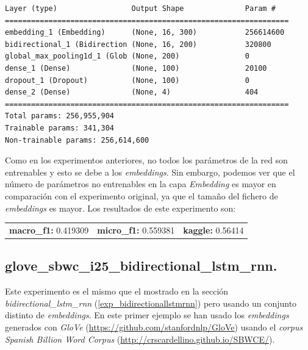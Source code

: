 \documentclass[11pt]{article}
\begin{document}
\begin{verbatim}
Layer (type)                 Output Shape              Param #   
=================================================================
embedding_1 (Embedding)      (None, 16, 300)           256614600 
bidirectional_1 (Bidirection (None, 16, 200)           320800    
global_max_pooling1d_1 (Glob (None, 200)               0         
dense_1 (Dense)              (None, 100)               20100     
dropout_1 (Dropout)          (None, 100)               0         
dense_2 (Dense)              (None, 4)                 404       
=================================================================
Total params: 256,955,904
Trainable params: 341,304
Non-trainable params: 256,614,600
\end{verbatim}

Como en los experimentos anteriores, no todos los parámetros de la red son entrenables y esto se debe a los \textit{embeddings}. Sin embargo, podemos ver que el número de parámetros no entrenables en la capa \textit{Embedding} es mayor en comparación con el experimento original, ya que el tamaño del fichero de \textit{embeddings} es mayor. Los resultados de este experimento son: 

\begin{table}[H]
\begin{tabular}{c|c|c}
\textbf{macro\_f1:} 0.419309 & \textbf{micro\_f1:} 0.559381 & \textbf{kaggle:} 0.56414
\end{tabular}
\end{table}

\subsection{glove\_sbwc\_i25\_bidirectional\_lstm\_rnn.} \label{exp_glovesbwci25bidirectionallstmrnn}

Este experimento es el mismo que el mostrado en la sección \textit{bidirectional\_lstm\_rnn} (\ref{exp_bidirectionallstmrnn}) pero usando un conjunto distinto de \textit{embeddings}. En este primer ejemplo se han usado los \textit{embeddings} generados con \textit{GloVe} (\href{https://github.com/stanfordnlp/GloVe}{https://github.com/stanfordnlp/GloVe}) usando el \textit{corpus} \textit{Spanish Billion Word Corpus} (\href{http://crscardellino.github.io/SBWCE/}{http://crscardellino.github.io/SBWCE/}).
\end{document}
